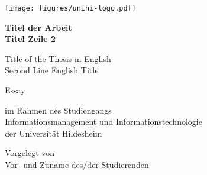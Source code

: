 \documentclass[12pt,        %
  english,ngerman,          %
  paper=a4,                 %
  captions=tablesignature,  %
  listof=numbered,          %
  bibliography=totoc,       %
  headings=small,           %
  headinclude=false,        %
  footinclude=false,        %
  parskip=half-,            %
  oneside,                  %
  DIV=12                    %
  ]{scrartcl}                %
\begin{document}


\begin{titlepage}
\setcounter{page}{0}
  \begin{center}
    \texttt{[image: figures/unihi-logo.pdf]}\\

    \vfill

    {
      \Large
      \bfseries
      Titel der Arbeit\\    
      Titel Zeile 2
      
      \vspace{0.25cm}
      \normalsize
      \mdseries
        Title of the Thesis in English\\
        Second Line English Title
    }

    \vfill

    {
      \normalsize

      Essay

      im Rahmen des Studiengangs\\
      Informationsmanagement und Informationstechnologie\\
      der Universität Hildesheim

      \vfill

      Vorgelegt von\\
      Vor- und Zuname des/der Studierenden

}
\end{center}
\end{titlepage}
\end{document}
